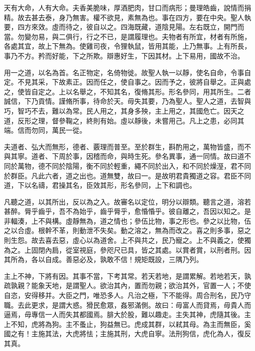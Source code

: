
\begin{pinyinscope}
天有大命，人有大命。夫香美脆味，厚酒肥肉，甘口而病形；曼理皓齒，說情而捐精。故去甚去泰，身乃無害。權不欲見，素無為也。事在四方，要在中央。聖人執要，四方來效。虛而待之，彼自以之。四海既藏，道陰見陽。左右既立，開門而當。勿變勿易，與二俱行，行之不已，是謂履理也。夫物者有所宜，材者有所施，各處其宜，故上下無為。使雞司夜，令狸執鼠，皆用其能，上乃無事。上有所長，事乃不方。矜而好能，下之所欺。辯惠好生，下因其材。上下易用，國故不治。

用一之道，以名為首。名正物定，名倚物徙。故聖人執一以靜，使名自命，令事自定。不見其采，下故素正。因而任之，使自事之。因而予之，彼將自舉之。正與處之，使皆自定之。上以名舉之，不知其名，復脩其形。形名參同，用其所生。二者誠信，下乃貢情。謹脩所事，待命於天。毋失其要，乃為聖人。聖人之道，去智與巧，智巧不去，難以為常。民人用之，其身多殃，主上用之，其國危亡。因天之道，反形之理，督參鞠之，終則有始。虛以靜後，未嘗用己。凡上之患，必同其端。信而勿同，萬民一從。

夫道者、弘大而無形，德者、覈理而普至。至於群生，斟酌用之，萬物皆盛，而不與其寧。道者、下周於事，因稽而命，與時生死。參名異事，通一同情。故曰道不同於萬物，德不同於陰陽，衡不同於輕重，繩不同於出入，和不同於燥溼，君不同於群臣。凡此六者，道之出也。道無雙，故曰一。是故明君貴獨道之容。君臣不同道，下以名禱，君操其名，臣效其形，形名參同，上下和調也。

凡聽之道，以其所出，反以為之入。故審名以定位，明分以辯類。聽言之道，溶若甚醉。脣乎齒乎，吾不為始乎，齒乎脣乎，愈惛惛乎。彼自離之，吾因以知之。是非輻湊，上不與構。虛靜無為，道之情也；參伍比物，事之形也。參之以比物，伍之以合虛。根幹不革，則動泄不失矣。動之溶之，無為而改之。喜之則多事，惡之則生怨。故去喜去惡，虛心以為道舍。上不與共之，民乃寵之。上不與義之，使獨為之。上固閉內扃，從室視庭，參咫尺已具，皆之其處。以賞者賞，以刑者刑。因其所為，各以自成。善惡必及，孰敢不信！規矩既設，三隅乃列。

主上不神，下將有因。其事不當，下考其常。若天若地，是謂累解。若地若天，孰疏孰親？能象天地，是謂聖人。欲治其內，置而勿親；欲治其外，官置一人；不使自恣，安得移并。大臣之門，唯恐多人。凡治之極，下不能得。周合刑名，民乃守職。去此更求，是謂大惑。猾民愈眾，姦邪滿側。故曰：毋富人而貸焉，毋貴人而逼焉，毋專信一人而失其都國焉。腓大於股，難以趣走。主失其神，虎隨其後。主上不知，虎將為狗。主不蚤止，狗益無已。虎成其群，以弒其母。為主而無臣，奚國之有！主施其法，大虎將怯；主施其刑，大虎自寧。法刑狗信，虎化為人，復反其真。


\end{pinyinscope}
